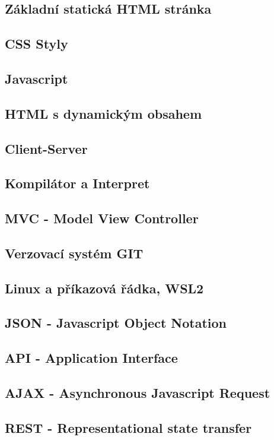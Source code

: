 \documentclass[14pt,a4paper]{article}
\begin{document}
        \subsection{Základní statická HTML stránka}
        \subsection{CSS Styly}
        \subsection{Javascript}
        \subsection{HTML s dynamickým obsahem}
        \subsection{Client-Server}
        \subsection{Kompilátor a Interpret}
        \subsection{MVC - Model View Controller}
        \subsection{Verzovací systém GIT}
        \subsection{Linux a příkazová řádka, WSL2}
        \subsection{JSON - Javascript Object Notation}
        \subsection{API - Application Interface}
        \subsection{AJAX - Asynchronous Javascript Request}
        \subsection{REST - Representational state transfer}
\end{document}
